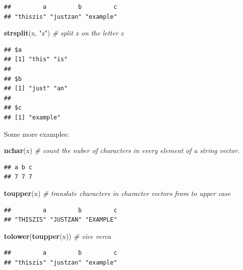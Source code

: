 \documentclass[]{book}
\newenvironment{Shaded}{\begin{snugshade}}{\end{snugshade}}
\newcommand{\KeywordTok}[1]{\textcolor[rgb]{0.13,0.29,0.53}{\textbf{#1}}}
\newcommand{\StringTok}[1]{\textcolor[rgb]{0.31,0.60,0.02}{#1}}
\newcommand{\CommentTok}[1]{\textcolor[rgb]{0.56,0.35,0.01}{\textit{#1}}}
\newcommand{\NormalTok}[1]{#1}
\theoremstyle{definition}
\theoremstyle{definition}
\theoremstyle{definition}
\theoremstyle{remark}
\begin{document}
\begin{verbatim}
##         a         b         c 
## "thiszis" "justzan" "example"
\end{verbatim}

\begin{Shaded}
\begin{Highlighting}[]
\KeywordTok{strsplit}\NormalTok{(x, }\StringTok{"z"}\NormalTok{) }\CommentTok{# split x on the letter z}
\end{Highlighting}
\end{Shaded}

\begin{verbatim}
## $a
## [1] "this" "is"  
## 
## $b
## [1] "just" "an"  
## 
## $c
## [1] "example"
\end{verbatim}

Some more examples:

\begin{Shaded}
\begin{Highlighting}[]
\KeywordTok{nchar}\NormalTok{(x) }\CommentTok{#  count the nuber of characters in every element of a string vector.}
\end{Highlighting}
\end{Shaded}

\begin{verbatim}
## a b c 
## 7 7 7
\end{verbatim}

\begin{Shaded}
\begin{Highlighting}[]
\KeywordTok{toupper}\NormalTok{(x) }\CommentTok{# translate characters in character vectors from to upper case}
\end{Highlighting}
\end{Shaded}

\begin{verbatim}
##         a         b         c 
## "THISZIS" "JUSTZAN" "EXAMPLE"
\end{verbatim}

\begin{Shaded}
\begin{Highlighting}[]
\KeywordTok{tolower}\NormalTok{(}\KeywordTok{toupper}\NormalTok{(x)) }\CommentTok{# vice verca}
\end{Highlighting}
\end{Shaded}

\begin{verbatim}
##         a         b         c 
## "thiszis" "justzan" "example"
\end{verbatim}
\end{document}
